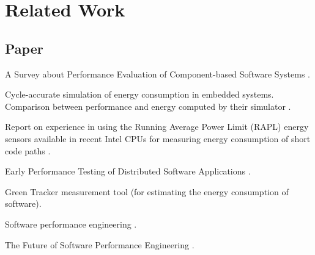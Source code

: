 
\chapter{Related Work}
\label{rel_work}

\section{Paper}

A Survey about Performance Evaluation of Component-based Software Systems \cite{koziolek2010performance}.

Cycle-accurate simulation of energy consumption in embedded systems. Comparison between performance and energy computed by their simulator \cite{simunic1999cycle}.

Report on experience in using the Running Average Power Limit (RAPL) energy sensors available in recent Intel CPUs for measuring energy consumption
of short code paths \cite{hahnel2012measuring}.

Early Performance Testing of Distributed Software Applications \cite{denaro2004early}.

Green Tracker measurement tool (for estimating the
energy consumption of software)\cite{amsel2010green}.

Software performance engineering \cite{smith1993software}.

The Future of Software Performance Engineering \cite{woodside2007future}.

